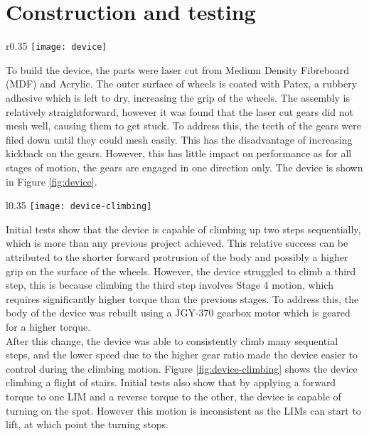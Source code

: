 \section{Construction and testing}

\begin{wrapfigure}{r}{0.35\textwidth}
	\centering
	\texttt{[image: device]}
	\caption{Built device}
	\label{fig:device}
\end{wrapfigure}

To build the device, the parts were laser cut from Medium Density Fibreboard (MDF) and Acrylic. The outer surface of wheels is coated with Patex, a rubbery adhesive which is left to dry, increasing the grip of the wheels. The assembly is relatively straightforward, however it was found that the laser cut gears did not mesh well, causing them to get stuck. To address this, the teeth of the gears were filed down until they could mesh easily. This has the disadvantage of increasing kickback on the gears. However, this has little impact on performance as for all stages of motion, the gears are engaged in one direction only. The device is shown in Figure \ref{fig:device}.\\


\begin{wrapfigure}{l}{0.35\textwidth}
	\centering
	\texttt{[image: device-climbing]}
	\caption{Device climbing stairs}
	\label{fig:device-climbing}
\end{wrapfigure}
Initial tests show that the device is capable of climbing up two steps sequentially, which is more than any previous project achieved. This relative success can be attributed to the shorter forward protrusion of the body and possibly a higher grip on the surface of the wheels. However, the device struggled to climb a third step, this is because climbing the third step involves Stage 4 motion, which requires significantly higher torque than the previous stages. To address this, the body of the device was rebuilt using a JGY-370 gearbox motor which is geared for a higher torque. \\
After this change, the device was able to consistently climb many sequential steps, and the lower speed due to the higher gear ratio made the device easier to control during the climbing motion. Figure \ref{fig:device-climbing} shows the device climbing a flight of stairs. Initial tests also show that by applying a forward torque to one LIM and a reverse torque to the other, the device is capable of turning on the spot. However this motion is inconsistent as the LIMs can start to lift, at which point the turning stops.


